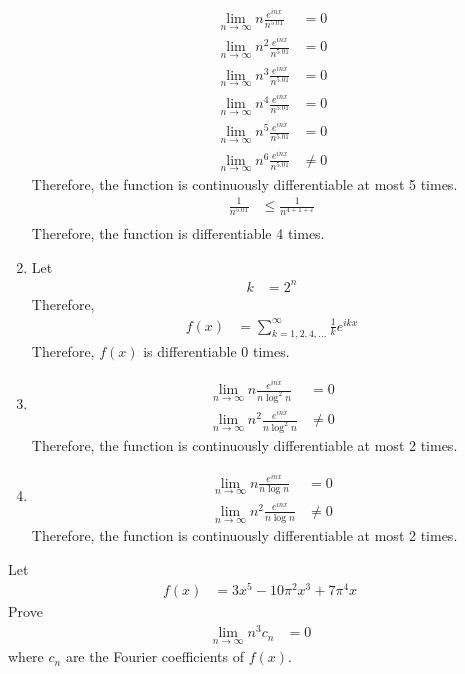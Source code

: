 \documentclass[fleqn, a4paper, 11pt, oneside]{amsart}
\theoremstyle{definition}
\theoremstyle{theorem}
\begin{document}
\begin{solution}
\begin{enumerate}[leftmargin=*]
\begin{align*}
				\lim\limits_{n \to \infty} n \frac{e^{i n x}}{n^{5.01}}   & = 0 \\
				\lim\limits_{n \to \infty} n^2 \frac{e^{i n x}}{n^{5.01}} & = 0 \\
				\lim\limits_{n \to \infty} n^3 \frac{e^{i n x}}{n^{5.01}} & = 0 \\
				\lim\limits_{n \to \infty} n^4 \frac{e^{i n x}}{n^{5.01}} & = 0 \\
				\lim\limits_{n \to \infty} n^5 \frac{e^{i n x}}{n^{5.01}} & = 0 \\
				\lim\limits_{n \to \infty} n^6 \frac{e^{i n x}}{n^{5.01}} & \neq 0
			\end{align*}
			Therefore, the function is continuously differentiable at most 5 times.
			\begin{align*}
				\frac{1}{n^{5.01}} & \le \frac{1}{n^{4 + 1 + \varepsilon}} \\
			\end{align*}
			Therefore, the function is differentiable 4 times.
		\item
			Let
			\begin{align*}
				k & = 2^n
			\end{align*}
			Therefore,
			\begin{align*}
				f(x) & = \sum\limits_{k = 1,2,4,\dots}^{\infty} \frac{1}{k} e^{i k x}
			\end{align*}
			Therefore, $f(x)$ is differentiable 0 times.\\
		\item
			\begin{align*}
				\lim\limits_{n \to \infty} n \frac{e^{i n x}}{n \log^2 n}   & = 0 \\
				\lim\limits_{n \to \infty} n^2 \frac{e^{i n x}}{n \log^2 n} & \neq 0
			\end{align*}
			Therefore, the function is continuously differentiable at most 2 times.
		\item
			\begin{align*}
				\lim\limits_{n \to \infty} n \frac{e^{i n x}}{n \log n}   & = 0 \\
				\lim\limits_{n \to \infty} n^2 \frac{e^{i n x}}{n \log n} & \neq 0
			\end{align*}
			Therefore, the function is continuously differentiable at most 2 times.
	\end{enumerate}
\end{solution}

\begin{question}
	Let
	\begin{align*}
		f(x) & = 3 x^5 - 10 \pi^2 x^3 + 7 \pi^4 x
	\end{align*}
	Prove
	\begin{align*}
		\lim\limits_{n \to \infty} n^3 c_n & = 0
	\end{align*}
	where $c_n$ are the Fourier coefficients of $f(x)$.
\end{question}
\end{document}
